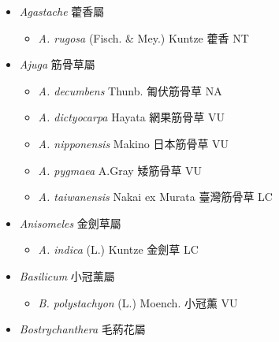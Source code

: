 
  \begin{itemize}
 \item[] \textit{Agastache} 藿香屬
                                
  \begin{itemize}
        \item[] \textit{A. rugosa} (Fisch. \& Mey.) Kuntze  藿香   NT
  \end{itemize}
 \item[] \textit{Ajuga} 筋骨草屬
                                
  \begin{itemize}
        \item[] \textit{A. decumbens} Thunb.  匍伏筋骨草   NA
        \item[] \textit{A. dictyocarpa} Hayata  網果筋骨草   VU
        \item[] \textit{A. nipponensis} Makino  日本筋骨草   VU
        \item[] \textit{A. pygmaea} A.Gray  矮筋骨草   VU
        \item[] \textit{A. taiwanensis} Nakai ex Murata  臺灣筋骨草   LC
  \end{itemize}
 \item[] \textit{Anisomeles} 金劍草屬
                                
  \begin{itemize}
        \item[] \textit{A. indica} (L.) Kuntze  金劍草   LC
  \end{itemize}
 \item[] \textit{Basilicum} 小冠薰屬
                                
  \begin{itemize}
        \item[] \textit{B. polystachyon} (L.) Moench.  小冠薰   VU
  \end{itemize}
 \item[] \textit{Bostrychanthera} 毛葯花屬
                                

\end{itemize}
